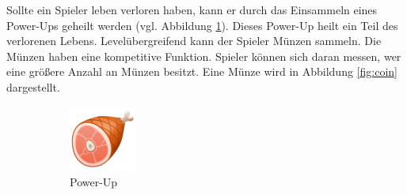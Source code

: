 Sollte ein Spieler leben verloren haben, kann er durch das Einsammeln eines Power-Ups geheilt werden (vgl. Abbildung \ref{fig:eat}). Dieses Power-Up heilt ein Teil des verlorenen Lebens. 
Levelübergreifend kann der Spieler Münzen sammeln. Die Münzen haben eine kompetitive Funktion. Spieler können sich daran messen, wer eine größere Anzahl an Münzen besitzt. Eine Münze wird in Abbildung \ref{fig:coin} dargestellt.

\begin{figure}[H]
    \centering
    \begin{subfigure}[H]{0.15\textwidth}
        \includegraphics[width=\textwidth]{img/realisierung/assets/eat}
        \caption{Power-Up}
        \label{fig:eat}
    \end{subfigure}
    \qquad
    \begin{subfigure}[H]{0.15\textwidth}

\end{subfigure}
\end{figure}

